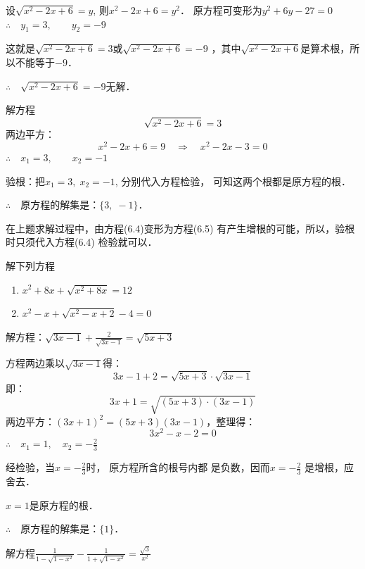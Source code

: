 \begin{solution}
    设$\sqrt{x^2-2x+6}=y$, 则$x^2-2x+6=y^2$．
原方程可变形为$y^2+6y-27=0$
$\therefore\quad y_1=3,\qquad y_2=-9$

这就是$\sqrt{x^2-2x+6}=3$或$\sqrt{x^2-2x+6}=-9$
，其中$\sqrt{x^2-2x+6}$是算术根，所以不能等于$-9$．

$\therefore\quad \sqrt{x^2-2x+6}=-9$无解．

解方程
\begin{equation}
    \sqrt{x^2-2x+6}=3
\end{equation}
两边平方：
\begin{equation}
    x^2-2x+6=9 \quad \Rightarrow\quad  x^2-2x-3=0
\end{equation}
$\therefore\quad x_1=3,\qquad x_2=-1$

验根：把$x_1=3,\; x_2=-1$, 分别代入方程检验，
可知这两个根都是原方程的根．

$\therefore\quad $原方程的解集是：$\{3,\;-1\}$．
\end{solution}

在上题求解过程中，由方程(6.4)变形为方程(6.5)
有产生增根的可能，所以，验根时只须代入方程(6.4)
检验就可以．

\begin{ex}
    解下列方程
    \begin{enumerate}
        \item $x^2+8x+\sqrt{x^2+8x}=12$
        \item $x^2-x+\sqrt{x^2-x+2}-4=0$
    \end{enumerate}
\end{ex}

\begin{example}
    解方程：$\sqrt{3x-1}+\frac{2}{\sqrt{3x-1}}=\sqrt{5x+3}$
\end{example}

\begin{solution}
    方程两边乘以$\sqrt{3x-1}$得：
\[3x-1+2=\sqrt{5x+3}\cdot \sqrt{3x-1} \]
即：
\[3x+1=\sqrt{(5x+3)\cdot (3x-1)}\]
两边平方：$(3x+1)^2=(5x+3)  (3x-1)$，整理得：
\[3x^2-x-2=0 \]
$\therefore\quad x_1=1,\quad x_2=-\frac{2}{3}$

经检验，当$x=-\frac{2}{3}$时，
原方程所含的根号内都
是负数，因而$x=-\frac{2}{3}$
是增根，应舍去．

$x=1$是原方程的根．

$\therefore\quad $原方程的解集是：$\{1\}$．
\end{solution}

\begin{example}
    解方程$\frac{1}{1-\sqrt{1-x^2}}-\frac{1}{1+\sqrt{1-x^2}}=\frac{\sqrt{3}}{x^2}$
\end{example}

